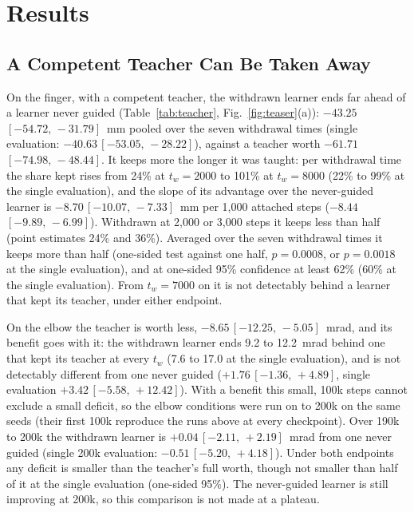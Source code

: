\documentclass[journal]{IEEEtran}
\newcommand{\ci}[3]{$#1$\,\allowbreak$[#2,\allowbreak\,#3]$}
\begin{document}
\section{Results}

\subsection{A Competent Teacher Can Be Taken Away}
\label{sec:withdraw}
\begin{table}[!t]
\caption{Taking the teacher away, pooled over the seven withdrawal times
($t_w=2000,\dots,8000$), $n=12$, under both endpoints. Worth:
constant$-$none, what keeping the teacher gives over never
being guided. Withdrawn$-$never: abrupt$-$none. Kept: the
largest fraction of the teacher's worth that the withdrawn learner keeps at
one-sided 95\% confidence (descriptive bound). n.s.: no positive fraction passes. Brackets: 95\% interval. Bold: interval excluding zero.}
\label{tab:teacher}
\centering\footnotesize
\setlength{\tabcolsep}{4pt}

\end{table}

On the finger, with a competent teacher, the withdrawn learner ends far ahead
of a learner never guided (Table~\ref{tab:teacher}, Fig.~\ref{fig:teaser}(a)):
\ci{-43.25}{-54.72}{-31.79}~mm pooled over the seven withdrawal times
(single evaluation: \ci{-40.63}{-53.05}{-28.22}), against a teacher worth
\ci{-61.71}{-74.98}{-48.44}. It keeps more the longer it was taught: per
withdrawal time the share kept rises from 24\% at $t_w=2000$ to 101\% at
$t_w=8000$ (22\% to 99\% at the single evaluation), and the slope of its
advantage over the never-guided learner is \ci{-8.70}{-10.07}{-7.33}~mm per
1{,}000 attached steps (\ci{-8.44}{-9.89}{-6.99}). Withdrawn at 2,000 or 3,000
steps it keeps less than half (point estimates 24\% and 36\%). Averaged over the seven withdrawal times it
keeps more than half (one-sided test against one half, $p=0.0008$, or $p=0.0018$ at the single
evaluation), and at one-sided 95\% confidence at least 62\% (60\%
at the single evaluation). From $t_w=7000$ on it is not
detectably behind a learner that kept its teacher, under either endpoint.

On the elbow the teacher is worth less, \ci{-8.65}{-12.25}{-5.05}~mrad, and its
benefit goes with it: the withdrawn learner ends 9.2 to 12.2~mrad behind one
that kept its teacher at every $t_w$ (7.6 to 17.0 at the single evaluation),
and is not detectably different from one never guided
(\ci{+1.76}{-1.36}{+4.89}, single evaluation \ci{+3.42}{-5.58}{+12.42}). With a
benefit this small, 100k steps cannot exclude a small deficit, so the elbow
conditions were run on to 200k on the same seeds (their first 100k reproduce
the runs above at every checkpoint). Over 190k to 200k the withdrawn learner is
\ci{+0.04}{-2.11}{+2.19}~mrad from one never guided (single 200k evaluation:
\ci{-0.51}{-5.20}{+4.18}). Under both endpoints any deficit is smaller than the
teacher's full worth, though not smaller than half of it at the single
evaluation (one-sided 95\%). The never-guided learner is still improving at
200k, so this comparison is not made at a plateau.
\end{document}
